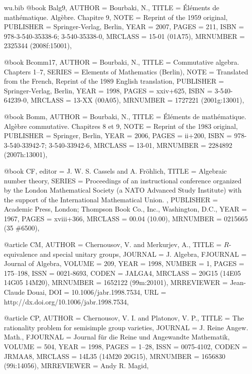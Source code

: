 \documentclass{amsart}
\numberwithin{equation}{section}
\theoremstyle{plain}
\theoremstyle{definition}
\begin{document}
\begin{filecontents}{wu.bib}
@book {Balg9, 
    AUTHOR = {Bourbaki, N.},
     TITLE = {\'{E}l\'ements de math\'ematique. {A}lg\`ebre. {C}hapitre 9},
      NOTE = {Reprint of the 1959 original},
 PUBLISHER = {Springer-Verlag, Berlin},
      YEAR = {2007},
     PAGES = {211},
      ISBN = {978-3-540-35338-6; 3-540-35338-0},
   MRCLASS = {15-01 (01A75)},
  MRNUMBER = {2325344 (2008f:15001)},
}

@book {Bcomm17, 
    AUTHOR = {Bourbaki, N.},
     TITLE = {Commutative algebra. {C}hapters 1--7},
    SERIES = {Elements of Mathematics (Berlin)},
      NOTE = {Translated from the French,
              Reprint of the 1989 English translation},
 PUBLISHER = {Springer-Verlag, Berlin},
      YEAR = {1998},
     PAGES = {xxiv+625},
      ISBN = {3-540-64239-0},
   MRCLASS = {13-XX (00A05)},
  MRNUMBER = {1727221 (2001g:13001)},
}

@book {Bomm, 
    AUTHOR = {Bourbaki, N.},
     TITLE = {\'{E}l\'ements de math\'ematique. {A}lg\`ebre commutative.
              {C}hapitres 8 et 9},
      NOTE = {Reprint of the 1983 original},
 PUBLISHER = {Springer, Berlin},
      YEAR = {2006},
     PAGES = {ii+200},
      ISBN = {978-3-540-33942-7; 3-540-33942-6},
   MRCLASS = {13-01},
  MRNUMBER = {2284892 (2007h:13001)},
}

@book {CF, 
    editor = {J. W. S. Cassels and A. Fr\"ohlich}, 
     TITLE = {Algebraic number theory},
    SERIES = {Proceedings of an instructional conference organized by the
              London Mathematical Society (a NATO Advanced Study Institute)
              with the support of the International Mathematical Union.
             },
 PUBLISHER = {Academic Press, London; Thompson Book Co., Inc., Washington,
              D.C.},
      YEAR = {1967},
     PAGES = {xviii+366},
   MRCLASS = {00.04 (10.00)},
  MRNUMBER = {0215665 (35 \#6500)},
}

@article {CM, 
    AUTHOR = {Chernousov, V. and Merkurjev, A.},
     TITLE = {{$R$}-equivalence and special unitary groups},
   JOURNAL = {J. Algebra},
  FJOURNAL = {Journal of Algebra},
    VOLUME = {209},
      YEAR = {1998},
    NUMBER = {1},
     PAGES = {175--198},
      ISSN = {0021-8693},
     CODEN = {JALGA4},
   MRCLASS = {20G15 (14E05 14G05 14M20)},
  MRNUMBER = {1652122 (99m:20101)},
MRREVIEWER = {Jean-Claude Douai},
       DOI = {10.1006/jabr.1998.7534},
       URL = {http://dx.doi.org/10.1006/jabr.1998.7534},
}

@article {CP, 
    AUTHOR = {Chernousov, V. I. and Platonov, V. P.},
     TITLE = {The rationality problem for semisimple group varieties},
   JOURNAL = {J. Reine Angew. Math.},
  FJOURNAL = {Journal f\"ur die Reine und Angewandte Mathematik},
    VOLUME = {504},
      YEAR = {1998},
     PAGES = {1--28},
      ISSN = {0075-4102},
     CODEN = {JRMAA8},
   MRCLASS = {14L35 (14M20 20G15)},
  MRNUMBER = {1656830 (99i:14056)},
MRREVIEWER = {Andy R. Magid},
}


\end{filecontents}
\end{document}
